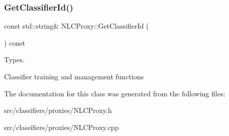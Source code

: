 \subsubsection{\texorpdfstring{Get\+Classifier\+Id()}{GetClassifierId()}}
{\footnotesize\ttfamily const std\+::string\& N\+L\+C\+Proxy\+::\+Get\+Classifier\+Id (\begin{DoxyParamCaption}{ }\end{DoxyParamCaption}) const\hspace{0.3cm}{\ttfamily [inline]}}



Types. 

Classifier training and management functions 

The documentation for this class was generated from the following files\+:\begin{DoxyCompactItemize}
\item 
src/classifiers/proxies/N\+L\+C\+Proxy.\+h\item 
src/classifiers/proxies/N\+L\+C\+Proxy.\+cpp\end{DoxyCompactItemize}
